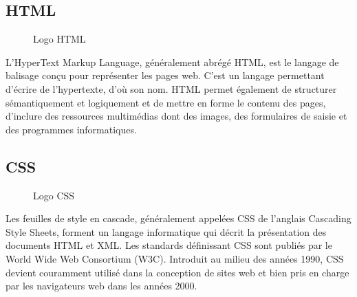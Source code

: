 \subsection{HTML}
\begin{figure}[H]
    \centering
    \caption{Logo HTML}
\end{figure}
L’HyperText Markup Language, généralement abrégé HTML, est le langage de balisage conçu pour représenter les pages web. C’est un langage permettant d’écrire de l’hypertexte, d’où son nom. HTML permet également de structurer sémantiquement et logiquement et de mettre en forme le contenu des pages, d’inclure des ressources multimédias dont des images, des formulaires de saisie et des programmes informatiques.
\subsection{CSS}
\begin{figure}[H]
    \centering
    \caption{Logo CSS}
\end{figure}
Les feuilles de style en cascade, généralement appelées CSS de l'anglais Cascading Style Sheets, forment un langage informatique qui décrit la présentation des documents HTML et XML. Les standards définissant CSS sont publiés par le World Wide Web Consortium (W3C). Introduit au milieu des années 1990, CSS devient couramment utilisé dans la conception de sites web et bien pris en charge par les navigateurs web dans les années 2000.


